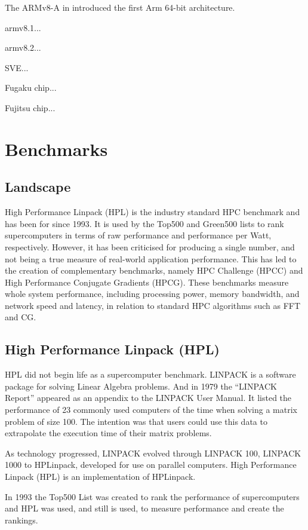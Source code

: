 The ARMv8-A in introduced the first Arm 64-bit architecture.

armv8.1...

armv8.2...

SVE...

Fugaku chip...

Fujitsu chip... 


%
%
\section{Benchmarks}

\subsection{Landscape}

High Performance Linpack (HPL) is the industry standard HPC benchmark and has been for since 1993. It is used by the Top500 and Green500 lists to rank supercomputers in terms of raw performance and performance per Watt, respectively. However, it has been criticised for producing a single number, and not being a true measure of real-world application performance. This has led to the creation of complementary benchmarks, namely HPC Challenge (HPCC) and High Performance Conjugate Gradients (HPCG). These benchmarks measure whole system performance, including processing power, memory bandwidth, and network speed and latency, in relation to standard HPC algorithms such as FFT and CG.


%
%
\subsection{High Performance Linpack (HPL)}

HPL did not begin life as a supercomputer benchmark. LINPACK is a software package for solving Linear Algebra problems. And in 1979 the ``LINPACK Report'' appeared as an appendix to the LINPACK User Manual. It listed the performance of 23 commonly used computers of the time when solving a matrix problem of size 100. The intention was that users could use this data to extrapolate the execution time of their matrix problems.

As technology progressed, LINPACK evolved through LINPACK 100, LINPACK 1000 to HPLinpack, developed for use on parallel computers. High Performance Linpack (HPL) is an implementation of HPLinpack.

In 1993 the Top500 List was created to rank the performance of supercomputers and HPL was used, and still is used, to measure performance and create the rankings.

